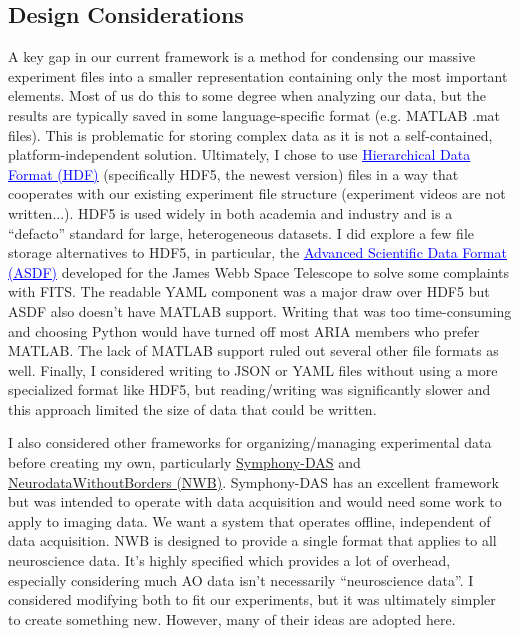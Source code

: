 \documentclass[10pt]{exam}
\newcommand\myurl[1]{\textcolor{blue}{\underline{#1}}}
\begin{document}
	\subsection{Design Considerations}
		\noindent A key gap in our current framework is a method for condensing our massive experiment files into a smaller representation containing only the most important elements. Most of us do this to some degree when analyzing our data, but the results are typically saved in some language-specific format (e.g. MATLAB .mat files). This is problematic for storing complex data as it is not a self-contained, platform-independent solution. Ultimately, I chose to use \href{https://portal.hdfgroup.org/display/support}{\myurl{Hierarchical Data Format (HDF)}} (specifically HDF5, the newest version) files\cite{Folk2011} in a way that cooperates with our existing experiment file structure (experiment videos are not written...). HDF5 is used widely in both academia and industry and is a ``defacto'' standard for large, heterogeneous datasets. 
		I did explore a few file storage alternatives to HDF5, in particular, the \href{https://github.com/asdf-format/asdf-standard}{\myurl{Advanced Scientific Data Format (ASDF)}} developed for the James Webb Space Telescope to solve some complaints with FITS\cite{Greenfield2015}. The readable YAML component was a major draw over HDF5 but ASDF also doesn't have MATLAB support. Writing that was too time-consuming and choosing Python would have turned off most ARIA members who prefer MATLAB. The lack of MATLAB support ruled out several other file formats as well. Finally, I considered writing to JSON or YAML files without using a more specialized format like HDF5\cite{Dragly2018}, but reading/writing was significantly slower and this approach limited the size of data that could be written.
		
		I also considered other frameworks for organizing/managing experimental data before creating my own, particularly  \myurl{\href{https://github.com/Symphony-DAS/symphony-matlab}{Symphony-DAS}} and \myurl{\href{https://github.com/NeurodataWithoutBorders}{NeurodataWithoutBorders (NWB)}}\cite{Teeters2015,Rubel2019}. Symphony-DAS has an excellent framework but was intended to operate with data acquisition and would need some work to apply to imaging data. We want a system that operates offline, independent of data acquisition. NWB is designed to provide a single format that applies to all neuroscience data. It's highly specified which provides a lot of overhead, especially considering much AO data isn't necessarily ``neuroscience data''. I considered modifying both to fit our experiments, but it was ultimately simpler to create something new. However, many of their ideas are adopted here. 
		
\end{document}
